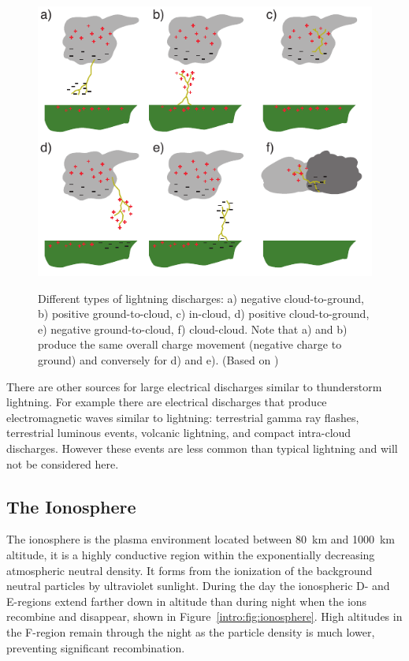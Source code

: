 \begin{figure}[ht!]
	\centering
	\includegraphics[scale=1]{Introduction/Figures/lightning_types.pdf}\\
	\caption{Different types of lightning discharges:
			a) negative cloud-to-ground,
			b) positive ground-to-cloud,
			c) in-cloud,
			d) positive cloud-to-ground,
			e) negative ground-to-cloud,
			f) cloud-cloud.
			Note that a) and b) produce the same overall charge movement (negative charge to ground) and conversely for d) and e).
			 (Based on \citet{Uman1969})}
	\label{intro:fig:types}
\end{figure}

There are other sources for large electrical discharges similar to thunderstorm lightning.
For example there are electrical discharges that produce electromagnetic waves similar to lightning: terrestrial gamma ray flashes, terrestrial luminous events, volcanic lightning, and compact intra-cloud discharges.
However these events are less common than typical lightning and will not be considered here.

\subsection{The Ionosphere}

The ionosphere is the plasma environment located between 80~km and 1000~km altitude, it is a highly conductive region within the exponentially decreasing atmospheric neutral density.
It forms from the ionization of the background neutral particles by ultraviolet sunlight.
During the day the ionospheric D- and E-regions extend farther down in altitude than during night when the ions recombine and disappear, shown in Figure~\ref{intro:fig:ionosphere}.
High altitudes in the F-region remain through the night as the particle density is much lower, preventing significant recombination.

